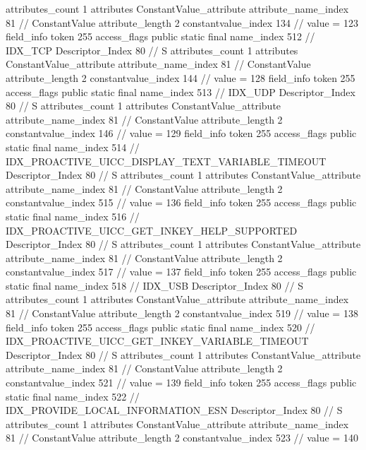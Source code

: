 {{{{{				attributes_count	1
				attributes {
				ConstantValue_attribute {
					attribute_name_index	81		// ConstantValue
					attribute_length	2
					constantvalue_index	134		// value = 123
				}
				}
			}
			field_info {
				token	255
				access_flags	public static final
				name_index	512		// IDX_TCP
				Descriptor_Index	80		// S
				attributes_count	1
				attributes {
				ConstantValue_attribute {
					attribute_name_index	81		// ConstantValue
					attribute_length	2
					constantvalue_index	144		// value = 128
				}
				}
			}
			field_info {
				token	255
				access_flags	public static final
				name_index	513		// IDX_UDP
				Descriptor_Index	80		// S
				attributes_count	1
				attributes {
				ConstantValue_attribute {
					attribute_name_index	81		// ConstantValue
					attribute_length	2
					constantvalue_index	146		// value = 129
				}
				}
			}
			field_info {
				token	255
				access_flags	public static final
				name_index	514		// IDX_PROACTIVE_UICC_DISPLAY_TEXT_VARIABLE_TIMEOUT
				Descriptor_Index	80		// S
				attributes_count	1
				attributes {
				ConstantValue_attribute {
					attribute_name_index	81		// ConstantValue
					attribute_length	2
					constantvalue_index	515		// value = 136
				}
				}
			}
			field_info {
				token	255
				access_flags	public static final
				name_index	516		// IDX_PROACTIVE_UICC_GET_INKEY_HELP_SUPPORTED
				Descriptor_Index	80		// S
				attributes_count	1
				attributes {
				ConstantValue_attribute {
					attribute_name_index	81		// ConstantValue
					attribute_length	2
					constantvalue_index	517		// value = 137
				}
				}
			}
			field_info {
				token	255
				access_flags	public static final
				name_index	518		// IDX_USB
				Descriptor_Index	80		// S
				attributes_count	1
				attributes {
				ConstantValue_attribute {
					attribute_name_index	81		// ConstantValue
					attribute_length	2
					constantvalue_index	519		// value = 138
				}
				}
			}
			field_info {
				token	255
				access_flags	public static final
				name_index	520		// IDX_PROACTIVE_UICC_GET_INKEY_VARIABLE_TIMEOUT
				Descriptor_Index	80		// S
				attributes_count	1
				attributes {
				ConstantValue_attribute {
					attribute_name_index	81		// ConstantValue
					attribute_length	2
					constantvalue_index	521		// value = 139
				}
				}
			}
			field_info {
				token	255
				access_flags	public static final
				name_index	522		// IDX_PROVIDE_LOCAL_INFORMATION_ESN
				Descriptor_Index	80		// S
				attributes_count	1
				attributes {
				ConstantValue_attribute {
					attribute_name_index	81		// ConstantValue
					attribute_length	2
					constantvalue_index	523		// value = 140
}}}}}}}
